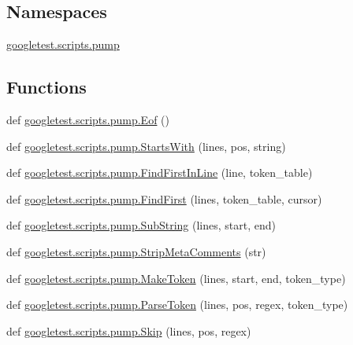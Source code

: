 \subsection*{Namespaces}
\begin{DoxyCompactItemize}
\item 
 \mbox{\hyperlink{namespacegoogletest_1_1scripts_1_1pump}{googletest.\+scripts.\+pump}}
\end{DoxyCompactItemize}
\subsection*{Functions}
\begin{DoxyCompactItemize}
\item 
def \mbox{\hyperlink{namespacegoogletest_1_1scripts_1_1pump_abae28750e9c44b59243854c9c8249717}{googletest.\+scripts.\+pump.\+Eof}} ()
\item 
def \mbox{\hyperlink{namespacegoogletest_1_1scripts_1_1pump_a8179e17bde05923198fb01d990bd0361}{googletest.\+scripts.\+pump.\+Starts\+With}} (lines, pos, string)
\item 
def \mbox{\hyperlink{namespacegoogletest_1_1scripts_1_1pump_a6a0fa99653fbe6b626e3775e62d5a6a3}{googletest.\+scripts.\+pump.\+Find\+First\+In\+Line}} (line, token\+\_\+table)
\item 
def \mbox{\hyperlink{namespacegoogletest_1_1scripts_1_1pump_aebdca81c221b3c1bcc5d4887ae98eaed}{googletest.\+scripts.\+pump.\+Find\+First}} (lines, token\+\_\+table, cursor)
\item 
def \mbox{\hyperlink{namespacegoogletest_1_1scripts_1_1pump_ad5f087df98d72b3d0263fd8cd16f9c92}{googletest.\+scripts.\+pump.\+Sub\+String}} (lines, start, end)
\item 
def \mbox{\hyperlink{namespacegoogletest_1_1scripts_1_1pump_a61b93d0aeb7eacf9e6df72d6094eaaa8}{googletest.\+scripts.\+pump.\+Strip\+Meta\+Comments}} (str)
\item 
def \mbox{\hyperlink{namespacegoogletest_1_1scripts_1_1pump_a9839cec6b6dc4865995a53363f6fdd67}{googletest.\+scripts.\+pump.\+Make\+Token}} (lines, start, end, token\+\_\+type)
\item 
def \mbox{\hyperlink{namespacegoogletest_1_1scripts_1_1pump_a905a4c3d715d0faafc8c47dba05cbc77}{googletest.\+scripts.\+pump.\+Parse\+Token}} (lines, pos, regex, token\+\_\+type)
\item 
def \mbox{\hyperlink{namespacegoogletest_1_1scripts_1_1pump_a7a115eabe50d7cacfbaa2ee78b66d738}{googletest.\+scripts.\+pump.\+Skip}} (lines, pos, regex)
\item 

\end{DoxyCompactItemize}
